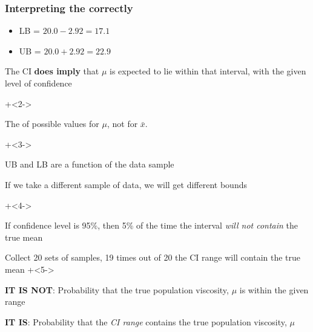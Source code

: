 \begin{frame}\frametitle{Interpreting the {\color{purple}{confidence interval (CI)}} {\color{blue} correctly}}
	
	\begin{itemize}
		\item	LB = $20.0 - 2.92 = 17.1$
		\item	UB = $20.0 + 2.92 = 22.9$
	\end{itemize}
	
	\myhrule
	\begin{itemize}
		\item	The CI \textbf{does imply} that $\mu$ is expected to lie within that interval, with the given level of confidence
		
		\onslide+<2->{
			\item	The {} of possible values for $\mu$, not for $\bar{x}$.
		}
		\onslide+<3->{
			\item	UB and LB are a function of the data sample
			\item	If we take a different sample of data, we will get different bounds
		}
		\onslide+<4->{
		\begin{itemize}
			\item	If confidence level is 95\%, then 5\% of the time the interval \emph{will not contain} the true mean
			\item	Collect 20 sets of samples, 19 times out of 20 the CI range will contain the true mean
			\onslide+<5->{
				\item	\textbf{IT IS NOT}: Probability that the true population viscosity, $\mu$ is within the given range {}
				\item	\textbf{IT IS}: Probability that the \emph{CI range} contains the true population viscosity, $\mu$
			}
		\end{itemize}
		}
	\end{itemize}
\end{frame}

